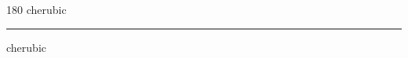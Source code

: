 
\begin{frame}
\begin{center}
\begin{turn}{180}
{\fontsize{2.5cm}{1em}\selectfont cherubic}
\end{turn}
\vspace{1em}\par  
\hrule
\vspace{1em}\par  
{\fontsize{2.5cm}{1em}\selectfont cherubic}
\end{center}
\end{frame}
